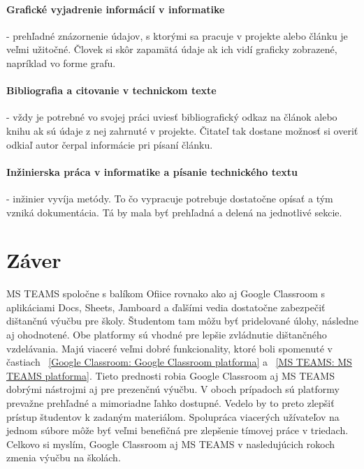 \documentclass[10pt,slovak,a4paper]{article}
\begin{document}
\paragraph{Grafické vyjadrenie informácií v informatike} \label{Grafické vyjadrenie informácií v informatike} - prehľadné znázornenie údajov, s ktorými sa pracuje v projekte alebo článku je veľmi užitočné. Človek si skôr zapamätá údaje ak ich vidí graficky zobrazené, napríklad vo forme grafu.

\paragraph{Bibliografia a citovanie v technickom texte} \label{Bibliografia a citovanie v technickom texte} - vždy je potrebné vo svojej práci uviesť bibliografický odkaz na článok alebo knihu ak sú údaje z nej zahrnuté v projekte. Čitateľ tak dostane možnosť si overiť odkiaľ autor čerpal informácie pri písaní článku.

\paragraph{Inžinierska práca v informatike a písanie technického textu}\label{Inžinierska práca v informatike a písanie technického textu} - inžinier vyvíja metódy. To čo vypracuje potrebuje dostatočne opísať a tým vzniká dokumentácia. Tá by mala byť prehľadná a delená na jednotlivé sekcie.


\section{Záver} \label{zaver} 
MS TEAMS spoločne s balíkom Ofiice rovnako ako aj Google Classroom s aplikáciami Docs, Sheets, Jamboard a ďalšími vedia dostatočne zabezpečiť dištančnú výučbu pre školy. Študentom tam môžu byť pridelované úlohy, následne aj ohodnotené. Obe platformy sú vhodné pre lepšie zvládnutie dištančného vzdelávania. Majú viaceré veľmi dobré funkcionality, ktoré boli spomenuté v častiach ~\ref {Google Classroom: Google Classroom platforma}  a  ~\ref{MS TEAMS: MS TEAMS platforma}. Tieto prednosti robia Google Classroom aj MS TEAMS dobrými nástrojmi aj pre prezenčnú výučbu. V oboch prípadoch sú platformy prevažne prehľadné a mimoriadne ľahko dostupné. Vedelo by to preto zlepšiť prístup študentov k zadaným materiálom. Spolupráca viacerých užívateľov na jednom súbore môže byť veľmi benefičná pre zlepšenie tímovej práce v triedach. Celkovo si myslím, Google Classroom aj MS TEAMS v nasledujúcich rokoch zmenia výučbu na školách.
\end{document}

